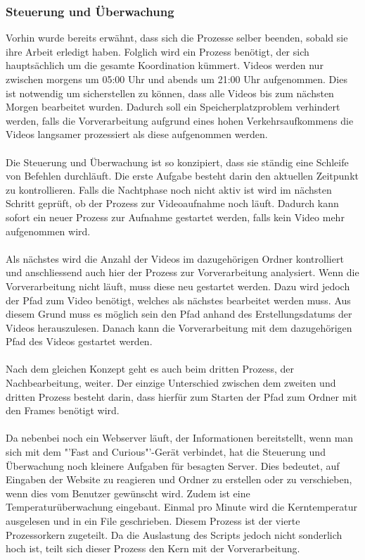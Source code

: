 \subsubsection{Steuerung und Überwachung}
Vorhin wurde bereits erwähnt, dass sich die Prozesse selber beenden, sobald sie ihre Arbeit erledigt haben. Folglich wird ein Prozess benötigt, der sich hauptsächlich um die gesamte Koordination kümmert. Videos werden nur zwischen morgens um 05:00 Uhr und abends um 21:00 Uhr aufgenommen. Dies ist notwendig um sicherstellen zu können, dass alle Videos bis zum nächsten Morgen bearbeitet wurden. Dadurch soll ein Speicherplatzproblem verhindert werden, falls die Vorverarbeitung aufgrund eines hohen Verkehrsaufkommens die Videos langsamer prozessiert als diese aufgenommen werden.\\\\
Die Steuerung und Überwachung ist so konzipiert, dass sie ständig eine Schleife von Befehlen durchläuft. Die erste Aufgabe besteht darin den aktuellen Zeitpunkt zu kontrollieren. Falls die Nachtphase noch nicht aktiv ist wird im nächsten Schritt geprüft, ob der Prozess zur Videoaufnahme noch läuft. Dadurch kann sofort ein neuer Prozess zur Aufnahme gestartet werden, falls kein Video mehr aufgenommen wird.\\\\
Als nächstes wird die Anzahl der Videos im dazugehörigen Ordner kontrolliert und anschliessend auch hier der Prozess zur Vorverarbeitung analysiert. Wenn die Vorverarbeitung nicht läuft, muss diese neu gestartet werden. Dazu wird jedoch der Pfad zum Video benötigt, welches als nächstes bearbeitet werden muss. Aus diesem Grund muss es möglich sein den Pfad anhand des Erstellungsdatums der Videos herauszulesen. Danach kann die Vorverarbeitung mit dem dazugehörigen Pfad des Videos gestartet werden.\\\\
Nach dem gleichen Konzept geht es auch beim dritten Prozess, der Nachbearbeitung, weiter. Der einzige Unterschied zwischen dem zweiten und dritten Prozess besteht darin, dass hierfür zum Starten der Pfad zum Ordner mit den Frames benötigt wird.\\\\
Da nebenbei noch ein Webserver läuft, der Informationen bereitstellt, wenn man sich mit dem "'Fast and Curious"'-Gerät verbindet, hat die Steuerung und Überwachung noch kleinere Aufgaben für besagten Server. Dies bedeutet, auf Eingaben der Website zu reagieren und Ordner zu erstellen oder zu verschieben, wenn dies vom Benutzer gewünscht wird. Zudem ist eine Temperaturüberwachung eingebaut. Einmal pro Minute wird die Kerntemperatur ausgelesen und in ein File geschrieben. Diesem Prozess ist der vierte Prozessorkern zugeteilt. Da die Auslastung des Scripts jedoch nicht sonderlich hoch ist, teilt sich dieser Prozess den Kern mit der Vorverarbeitung. \cite{Bash}
